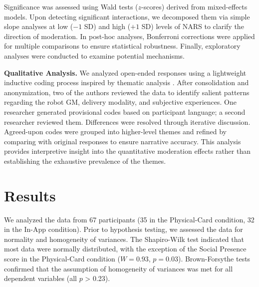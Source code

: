 \documentclass[sigconf,screen]{acmart-tagged}
\begin{document}
Significance was assessed using Wald tests ($z$-scores) derived from mixed-effects models. Upon detecting significant interactions, we decomposed them via simple slope analyses at low ($-1$ SD) and high ($+1$ SD) levels of NARS to clarify the direction of moderation. In post-hoc analyses, Bonferroni corrections were applied for multiple comparisons to ensure statistical robustness. Finally, exploratory analyses were conducted to examine potential mechanisms.

\noindent \textbf{Qualitative Analysis.}
We analyzed open-ended responses using a lightweight inductive coding process inspired by thematic analysis \cite{braun2006using}. After consolidation and anonymization, two of the authors reviewed the data to identify salient patterns regarding the robot GM, delivery modality, and subjective experiences. One researcher generated provisional codes based on participant language; a second researcher reviewed them. Differences were resolved through iterative discussion. Agreed-upon codes were grouped into higher-level themes and refined by comparing with original responses to ensure narrative accuracy. This analysis provides interpretive insight into the quantitative moderation effects rather than establishing the exhaustive prevalence of the themes.

\vspace{-6pt}
\section{Results}
We analyzed the data from 67 participants (35 in the Physical-Card condition, 32 in the In-App condition). Prior to hypothesis testing, we assessed the data for normality and homogeneity of variances. The Shapiro-Wilk test indicated that most data were normally distributed, with the exception of the Social Presence score in the Physical-Card condition ($W = 0.93$, $p = 0.03$). Brown-Forsythe tests confirmed that the assumption of homogeneity of variances was met for all dependent variables (all $p$ > 0.23).

\vspace{-6pt}
\end{document}
